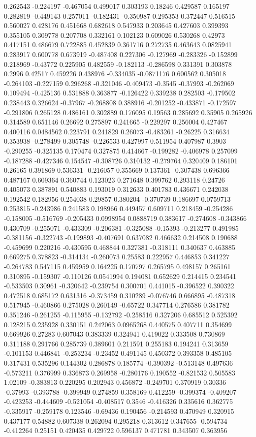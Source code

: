 0.262543 -0.224197 -0.467054 0.499017 0.303193 0.18246 0.429587 0.165197 0.282819 -0.449143 0.257011 -0.182431 -0.350987 0.295353 0.372447 0.516515 0.560027 0.428176 0.451668 0.682618 0.547933 0.203645 0.427603 0.399393 0.355105 0.309778 0.207708 0.332161 0.102123 0.609026 0.530268 0.42973 0.417151 0.486679 0.722885 0.452839 0.361716 0.272735 0.463643 0.0825941 0.283917 0.600778 0.673919 -0.487408 0.227306 -0.127969 -0.283326 -0.152899 0.218969 -0.43772 0.225905 0.482559 -0.182113 -0.286598 0.331391 0.303878 0.2996 0.42517 0.459226 0.438976 -0.334035 -0.0871176 0.600562 0.305018 -0.264103 -0.227159 0.296268 -0.321046 -0.409473 -0.3545 -0.37993 -0.262069 0.109494 -0.425136 0.531888 0.363877 -0.126422 0.339238 0.282503 -0.179502 0.238443 0.326624 -0.37967 -0.268808 0.388916 -0.201252 -0.433871 -0.172597 -0.291806 0.265128 0.486161 0.302889 0.176095 0.19563 0.285692 0.35905 0.265926 0.314589 0.651146 0.26692 0.275897 0.241665 -0.229297 0.256004 0.427467 0.400116 0.0484562 0.223791 0.241829 0.26073 -0.483261 -0.26225 0.316634 0.353938 -0.278499 0.305748 -0.226533 0.427997 0.511954 0.407987 0.3903 -0.290255 -0.325135 0.170474 0.327875 0.414667 -0.199282 -0.406978 0.257099 -0.187288 -0.427346 0.154547 -0.308726 0.310132 -0.279764 0.320409 0.186101 0.26165 0.391869 0.536331 -0.216057 0.355669 0.137361 -0.307438 0.696366 0.487167 0.609364 0.360744 0.123023 0.271648 0.399762 0.293118 0.24726 0.405073 0.387891 0.540883 0.193019 0.312633 0.401783 0.436671 0.242038 0.192542 0.182956 0.254038 0.29857 0.380204 -0.370739 0.186697 0.0759713 0.253815 -0.243986 0.241583 0.198966 0.449457 0.609711 0.218459 -0.254286 -0.158005 -0.516769 -0.205433 0.0998954 0.0888719 0.383617 -0.274608 -0.343866 0.430709 -0.255071 -0.433309 -0.206381 -0.325088 -0.15393 -0.213277 0.491985 -0.381156 -0.322743 -0.199893 -0.407691 0.637082 0.466632 0.214508 0.190688 -0.459699 0.220216 -0.430595 0.468844 0.327381 -0.318111 0.340637 0.463885 0.669275 0.378823 -0.314134 -0.260073 0.25583 0.222957 0.446853 0.341227 -0.264783 0.547115 0.459959 0.164225 0.170797 0.265795 0.498157 0.265161 0.310895 -0.159307 -0.110126 0.0541994 0.194081 0.652629 0.214415 0.234541 -0.533503 0.30961 -0.320642 -0.239754 0.300701 0.441015 -0.396522 0.390322 0.472518 0.685172 0.631316 -0.373459 0.310289 -0.076746 0.666895 -0.487318 0.517945 -0.460866 0.275028 0.260149 -0.65722 0.347714 0.276586 0.381782 0.351246 -0.261255 -0.115955 -0.132792 -0.258516 0.327206 0.685512 0.525392 0.128215 0.235928 0.330151 0.242063 0.0965268 0.440575 0.407711 0.354699 0.669926 0.27283 0.607043 0.383339 0.324941 0.419022 0.333508 0.730869 0.311188 0.291766 0.285739 0.389601 0.211591 0.255183 0.194241 0.313659 -0.101153 0.446841 -0.253234 -0.23452 0.491145 0.450372 0.393358 0.485105 0.317431 0.535296 0.144302 0.286878 0.185774 -0.390392 -0.513148 0.497636 -0.573211 0.376999 0.336873 0.269958 -0.280176 0.190552 -0.821532 0.505583 1.02109 -0.383813 0.220295 0.202943 0.456872 -0.249701 0.370919 0.30336 -0.37993 -0.393788 -0.399949 0.274859 0.358169 0.412259 -0.399374 -0.409207 -0.423253 -0.444609 -0.521054 -0.408517 0.3546 -0.416326 0.335616 0.362775 -0.335917 -0.259178 0.123546 -0.69436 0.190456 -0.214593 0.470949 0.320915 0.437177 0.54882 0.607338 0.262094 0.295218 0.313612 0.347655 -0.594734 -0.412264 0.25151 0.420435 0.429722 0.596137 0.471781 0.343507 0.363956 